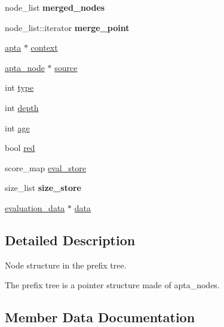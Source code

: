 \begin{DoxyCompactItemize}
\item 
node\+\_\+list {\bfseries merged\+\_\+nodes}\hypertarget{classapta__node_ae34492ec7e932baa6213d6a30e404e49}{}\label{classapta__node_ae34492ec7e932baa6213d6a30e404e49}

\item 
node\+\_\+list\+::iterator {\bfseries merge\+\_\+point}\hypertarget{classapta__node_a37ddeb80d7dd791ce7809faa219eb148}{}\label{classapta__node_a37ddeb80d7dd791ce7809faa219eb148}

\item 
\hyperlink{classapta}{apta} $\ast$ \hyperlink{classapta__node_a95d170076f0c3f9d98f2d1701dafd2cb}{context}
\item 
\hyperlink{classapta__node}{apta\+\_\+node} $\ast$ \hyperlink{classapta__node_a7a04123201ce6998a773656fa40cc60e}{source}
\item 
int \hyperlink{classapta__node_a9c1cf7c316ab485ff4435f90dda2766e}{type}
\item 
int \hyperlink{classapta__node_af55f64e7181c083d997bdf8b85cbe4d8}{depth}
\item 
int \hyperlink{classapta__node_a24d4af165b37f04090c85df1ef3ac997}{age}
\item 
bool \hyperlink{classapta__node_ab5e461390057947fba0c8ec64b7fd57a}{red}
\item 
score\+\_\+map \hyperlink{classapta__node_a61b271696a3f73cb1b5c74a303542522}{eval\+\_\+store}
\item 
size\+\_\+list {\bfseries size\+\_\+store}\hypertarget{classapta__node_a0bd52815004e691c4fa942b262477c0a}{}\label{classapta__node_a0bd52815004e691c4fa942b262477c0a}

\item 
\hyperlink{classevaluation__data}{evaluation\+\_\+data} $\ast$ \hyperlink{classapta__node_aaabfb6ff0a493a59541045927bc8b060}{data}
\end{DoxyCompactItemize}


\subsection{Detailed Description}
Node structure in the prefix tree. 

The prefix tree is a pointer structure made of apta\+\_\+nodes. 

\subsection{Member Data Documentation}
